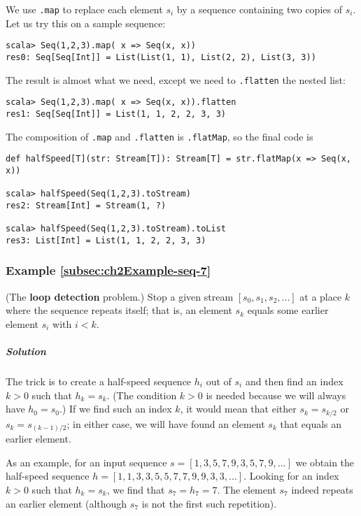 We use \lstinline!.map! to replace each element $s_{i}$ by a sequence
containing two copies of $s_{i}$. Let us try this on a sample sequence:
\begin{lstlisting}
scala> Seq(1,2,3).map( x => Seq(x, x))
res0: Seq[Seq[Int]] = List(List(1, 1), List(2, 2), List(3, 3))
\end{lstlisting}
The result is almost what we need, except we need to \lstinline!.flatten!
the nested list:
\begin{lstlisting}
scala> Seq(1,2,3).map( x => Seq(x, x)).flatten
res1: Seq[Seq[Int]] = List(1, 1, 2, 2, 3, 3)
\end{lstlisting}
The composition of \lstinline!.map! and \lstinline!.flatten! is
\lstinline!.flatMap!, so the final code is
\begin{lstlisting}
def halfSpeed[T](str: Stream[T]): Stream[T] = str.flatMap(x => Seq(x, x))

scala> halfSpeed(Seq(1,2,3).toStream)
res2: Stream[Int] = Stream(1, ?)

scala> halfSpeed(Seq(1,2,3).toStream).toList
res3: List[Int] = List(1, 1, 2, 2, 3, 3)
\end{lstlisting}


\subsubsection{Example \label{subsec:ch2Example-seq-7}\ref{subsec:ch2Example-seq-7}}

(The \textbf{loop detection} problem.) Stop
a given stream $\left[s_{0},s_{1},s_{2},...\right]$ at a place $k$
where the sequence repeats itself; that is, an element $s_{k}$ equals
some earlier element $s_{i}$ with $i<k$.

\subparagraph{Solution}

The trick is to create a half-speed sequence $h_{i}$ out of $s_{i}$
and then find an index $k>0$ such that $h_{k}=s_{k}$. (The condition
$k>0$ is needed because we will always have $h_{0}=s_{0}$.) If we
find such an index $k$, it would mean that either $s_{k}=s_{k/2}$
or $s_{k}=s_{\left(k-1\right)/2}$; in either case, we will have found
an element $s_{k}$ that equals an earlier element. 

As an example, for an input sequence $s=\left[1,3,5,7,9,3,5,7,9,...\right]$
we obtain the half-speed sequence $h=\left[1,1,3,3,5,5,7,7,9,9,3,3,...\right]$.
Looking for an index $k>0$ such that $h_{k}=s_{k}$, we find that
$s_{7}=h_{7}=7$. The element $s_{7}$ indeed repeats an earlier element
(although $s_{7}$ is not the first such repetition).

